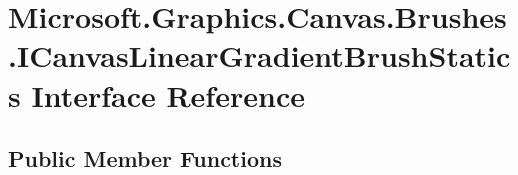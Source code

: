\hypertarget{interface_microsoft_1_1_graphics_1_1_canvas_1_1_brushes_1_1_i_canvas_linear_gradient_brush_statics}{}\section{Microsoft.\+Graphics.\+Canvas.\+Brushes.\+I\+Canvas\+Linear\+Gradient\+Brush\+Statics Interface Reference}
\label{interface_microsoft_1_1_graphics_1_1_canvas_1_1_brushes_1_1_i_canvas_linear_gradient_brush_statics}
\subsection*{Public Member Functions}
